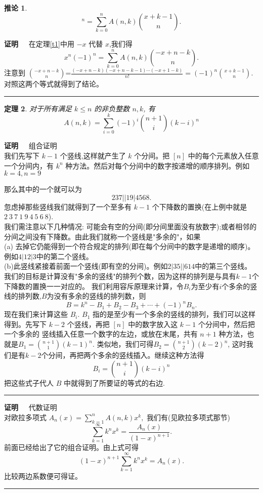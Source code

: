 \documentclass[a4paper,11pt]{article}
\newtheorem{thm}{定理}[section]
\newtheorem{coro}[thm]{推论}
\def\qed{\nopagebreak\hfill{\rule{4pt}{7pt}}\medbreak}
\def\pf{{\bf 证明~~ }}
\begin{document}
\begin{coro}
\begin{equation}
[x]^n=\sum_{k=0}^{n}A(n,k){x+k-1\choose n}.
\end{equation}
\end{coro}
\pf
 在定理\ref{t1}中用 $-x$ 代替 $x$,我们得
 $$x^n(-1)^n=\sum_{k=0}^{n}A(n,k){-x+n-k\choose n}.$$
 注意到 ${-x+n-k \choose n}$=$\frac{(-x+n-k)(-x+n-k-1)\cdots
(-x+1-k)}{n!}=(-1)^n{x+k-1 \choose
 n}$. 对照这两个等式就得到了结论。\qed

\begin{thm}
对于所有满足 $k\leq n$ 的非负整数 $n,k$, 有
\begin{equation}
A(n,k)=\sum_{i=0}^{k}(-1)^i{n+1 \choose i}(k-i)^n
\end{equation}
\end{thm}

\pf {组合证明}\\
我们先写下 $k-1$ 个竖线,这样就产生了 $k$ 个分间。把 $[n]$
中的每个元素放入任意一个分间内，有 $k^n$
种方法。然后对每个分间中的数字按递增的顺序排列。例如 $k=4,n=9$



那么其中的一个就可以为 $$237||19|4568.$$
忽虑掉那些竖线我们就得到了一个至多有 $k-1$
个下降数的置换(在上例中就是 $2~3~7~1~9~4~5~6~8$).
\\我们需注意以下几种情况:
可能会有空的分间(即分间里面没有放数字);或者相邻的分间之间没有下降数。由此我们就称一个竖线是"多余的"，如果
\\(a)
去掉它仍能得到一个符合规定的排列(即在每个分间中的数字是递增的顺序)。例如$4|12|3$中的第二个竖线。
\\(b)此竖线紧接着前面一个竖线(即有空的分间)。例如$2|35||614$中的第三个竖线。
我们的目标是计算没有"多余的竖线"的排列个数，因为这样的排列是与具有$k-1$个下降数的置换一一对应的。
我们利用容斥原理来计算，令$B_i$为至少有$i$个多余的竖线的排列数,$B$为没有多余的竖线的排列数，则
$$
B=k^n-B_1+B_2-B_3+\cdots +(-1)^nB_n.
$$
现在我们来计算这些 $B_i$. $B_1$
指的是至少有一个多余的竖线的排列，我们可以这样得到。先写下 $k-2$
个竖线，再把 $[n]$ 中的数字放入这 $k-1$ 个分间中，然后把一个多余的
竖线插入任意一个数字的左边，或放在末尾，共有 $n+1$
种方法，也就是$B_1={n+1 \choose 1}(k-1)^n$.
类似地，我们可得$B_2={n+1 \choose 2}(k-2)^n$,
这时我们是有$k-2$个分间，再把两个多余的竖线插入。继续这种方法得$$B_i={n+1
\choose i}(k-i)^n$$把这些式子代人 $B$
中就得到了所要证的等式的右边.\qed


\pf {代数证明}\\
 对欧拉多项式 $A_n(x)=\sum\limits^n_{k=1}A(n,k)x^k,$
我们有(见欧拉多项式那节)
$$\sum\limits^{\infty}_{k=1}k^nx^k=\frac{A_n(x)}{(1-x)^{n+1}}.$$
前面已经给出了它的组合证明。由上式可得$$(1-x)^{n+1}\sum\limits^{\infty}_{k=1}k^nx^k=A_n(x).$$
比较两边系数便可得证。\qed
\end{document}
